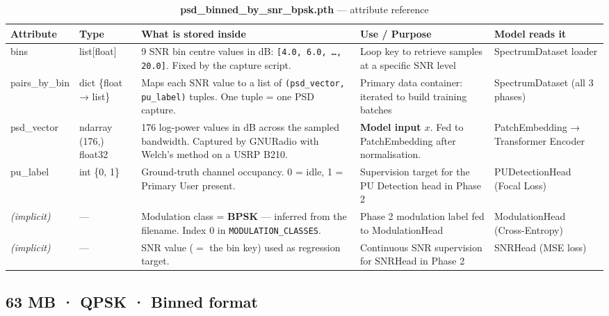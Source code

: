 \documentclass[11pt,a4paper]{article}
\begin{document}
\begin{table}[h!]
\centering
\caption{\textbf{psd\_binned\_by\_snr\_bpsk.pth} — attribute reference}
\renewcommand{\arraystretch}{1.55}
\begin{tabularx}{\textwidth}{>{\ttfamily\small}l l X l l}
\toprule
\textbf{Attribute} & \textbf{Type} & \textbf{What is stored inside} & \textbf{Use / Purpose} & \textbf{Model reads it} \\
\midrule

bins
  & list[float]
  & 9 SNR bin centre values in dB:
    \texttt{[4.0, 6.0, …, 20.0]}. Fixed by the capture script.
  & Loop key to retrieve samples at a specific SNR level
  & SpectrumDataset loader \\[6pt]

pairs\_by\_bin
  & dict \{float → list\}
  & Maps each SNR value to a list of
    \texttt{(psd\_vector, pu\_label)} tuples. One tuple = one PSD capture.
  & Primary data container: iterated to build training batches
  & SpectrumDataset (all 3 phases) \\[6pt]

\quad psd\_vector
  & ndarray (176,) float32
  & 176 log-power values in dB across the sampled bandwidth.
    Captured by GNURadio with Welch's method on a USRP B210.
  & \textbf{Model input $x$}. Fed to PatchEmbedding after normalisation.
  & PatchEmbedding → Transformer Encoder \\[6pt]

\quad pu\_label
  & int \{0, 1\}
  & Ground-truth channel occupancy. 0 = idle, 1 = Primary User present.
  & Supervision target for the PU Detection head in Phase 2
  & PUDetectionHead (Focal Loss) \\[6pt]

\textit{(implicit)}
  & —
  & Modulation class = \textbf{BPSK} — inferred from the filename.
    Index 0 in \texttt{MODULATION\_CLASSES}.
  & Phase 2 modulation label fed to ModulationHead
  & ModulationHead (Cross-Entropy) \\[6pt]

\textit{(implicit)}
  & —
  & SNR value ($=$ the bin key) used as regression target.
  & Continuous SNR supervision for SNRHead in Phase 2
  & SNRHead (MSE loss) \\

\bottomrule
\end{tabularx}
\end{table}

\subsection*{
\hfill\small 63 MB · QPSK · Binned format}
\end{document}
